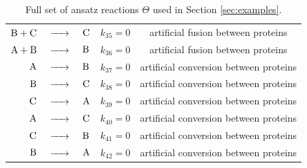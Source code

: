 \documentclass[oneside, abstracton, titlepage]{scrartcl}
\begin{document}
\begin{table}[h]
{\begin{tabular}{rclcc}
				$\ce{B + C}$ &$\ce{->}$& $\ce{C}$ & $k_{35} = 0$ & artificial fusion between proteins\\
				$\ce{A + B}$ &$\ce{->}$& $\ce{B}$ & $k_{36} = 0$ & artificial fusion between proteins\\
				$\ce{A}$ &$\ce{->}$& $\ce{B}$ & $k_{37} = 0$ & artificial conversion between proteins\\
				$\ce{B}$ &$\ce{->}$& $\ce{C}$ & $k_{38} = 0$ & artificial conversion between proteins\\
				$\ce{C}$ &$\ce{->}$& $\ce{A}$ & $k_{39} = 0$ & artificial conversion between proteins\\
				$\ce{A}$ &$\ce{->}$& $\ce{C}$ & $k_{40} = 0$ & artificial conversion between proteins\\
				$\ce{C}$ &$\ce{->}$& $\ce{B}$ & $k_{41} = 0$ & artificial conversion between proteins\\
				$\ce{B}$ &$\ce{->}$& $\ce{A}$ & $k_{42} = 0$ & artificial conversion between proteins
			\end{tabular}
		}
		\caption{Full set of ansatz reactions $\Theta$ used in Section \ref{sec:examples}.}
		\label{tab:reaction-library}
	\end{table}
\end{document}
